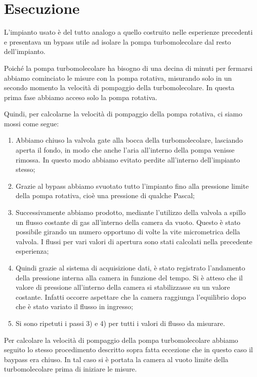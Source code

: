 \section{Esecuzione}

L'impianto usato è del tutto analogo a quello costruito nelle esperienze precedenti e presentava
un bypass utile ad isolare la pompa turbomolecolare dal resto dell'impianto.

Poiché la pompa turbomolecolare ha bisogno di una decina di minuti per fermarsi abbiamo cominciato le misure con la pompa rotativa,
misurando solo in un secondo momento la velocità di pompaggio della turbomolecolare. In questa prima
fase abbiamo acceso solo la pompa rotativa.

Quindi, per calcolarne la velocità di pompaggio della pompa rotativa, ci siamo mossi come segue:

\begin{enumerate}
	\item{Abbiamo chiuso la valvola gate alla bocca della turbomolecolare, lasciando aperta il fondo,
        in modo che anche l'aria all'interno della pompa venisse rimossa. In questo modo abbiamo evitato perdite
        all'interno dell'impianto stesso;}
	\item{Grazie al bypass abbiamo svuotato tutto l'impianto fino alla pressione limite della pompa rotativa,
        cioè una pressione di qualche Pascal;}
	\item{Successivamente abbiamo prodotto, mediante l'utilizzo della valvola a spillo un flusso
        costante di gas all'interno della camera da vuoto. Questo è stato possibile girando un numero opportuno
        di volte la vite micrometrica della valvola. I flussi per vari valori di apertura sono stati calcolati nella precedente
        esperienza;}
	\item{Quindi grazie al sistema di acquisizione dati, è stato registrato l'andamento della pressione interna alla
        camera in funzione del tempo.  Si è atteso che il valore di pressione all'interno della camera si
        stabilizzasse su un valore costante. Infatti occorre aspettare che la camera raggiunga l'equilibrio
        dopo che è stato variato il flusso in ingresso;}
	\item{Si sono ripetuti i passi 3) e 4) per tutti i valori di flusso da misurare.}
\end{enumerate}

Per calcolare la velocità di pompaggio della pompa turbomolecolare abbiamo seguito lo stesso procedimento
descritto sopra fatta eccezione che in questo caso il baypass era chiuso. In tal caso
si è portata la camera al vuoto limite della turbomolecolare prima di iniziare le misure.

